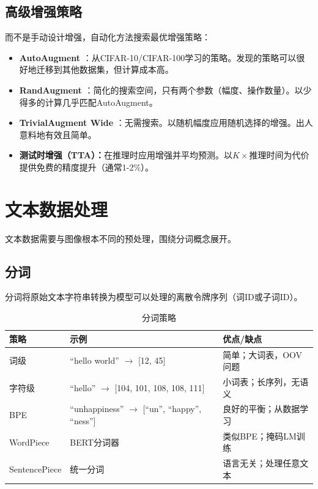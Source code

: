 \subsection{高级增强策略}

而不是手动设计增强，自动化方法搜索最优增强策略：

\begin{itemize}
    \item \textbf{AutoAugment} \cite{cubuk2019autoaugment}：从CIFAR-10/CIFAR-100学习的策略。发现的策略可以很好地迁移到其他数据集，但计算成本高。
    \item \textbf{RandAugment} \cite{cubuk2020randaugment}：简化的搜索空间，只有两个参数（幅度、操作数量）。以少得多的计算几乎匹配AutoAugment。
    \item \textbf{TrivialAugment Wide} \cite{muller2023torchvision}：无需搜索。以随机幅度应用随机选择的增强。出人意料地有效且简单。
    \item \textbf{测试时增强（TTA）：}在推理时应用增强并平均预测。以$K\times$推理时间为代价提供免费的精度提升（通常1-2\%）。
\end{itemize}

\section{文本数据处理}

文本数据需要与图像根本不同的预处理，围绕分词概念展开。

\subsection{分词}

分词将原始文本字符串转换为模型可以处理的离散令牌序列（词ID或子词ID）。

\begin{table}[ht]
    \centering
    \caption{分词策略}
    \begin{tabular}{L{3cm} L{4cm} L{4cm}}
        \toprule
        \textbf{策略} & \textbf{示例} & \textbf{优点/缺点} \\
        \midrule
        词级 & ``hello world'' $\to$ [12, 45] & 简单；大词表，OOV问题 \\
        字符级 & ``hello'' $\to$ [104, 101, 108, 108, 111] & 小词表；长序列，无语义 \\
        BPE & ``unhappiness'' $\to$ [``un'', ``happy'', ``ness''] & 良好的平衡；从数据学习 \\
        WordPiece & BERT分词器 & 类似BPE；掩码LM训练 \\
        SentencePiece & 统一分词 & 语言无关；处理任意文本 \\
        \bottomrule
    \end{tabular}
\end{table}

